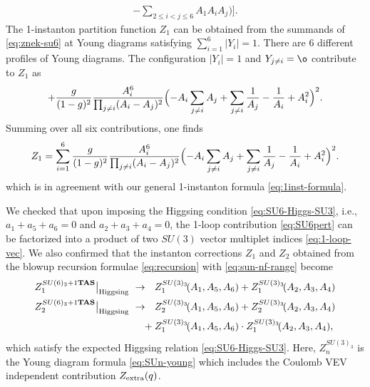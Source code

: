 \documentclass[letterpaper, 11pt]{article}
\begin{document}
{\begin{align}
    - \sum_{2\leq i<j \leq 6} A_1 A_i  A_j %
    \Bigr)
    \Biggr].
\end{align}
The 1-instanton partition function $Z_1$ can be obtained from the summands of \eqref{eq:znek-su6} at Young diagrams satisfying $\sum_{i=1}^6 |Y_i|=1$. There are 6 different profiles of Young diagrams. The configuration $|Y_i| = 1$ and %
$Y_{j\neq i} = \o$ contribute to $Z_{1}$ as
\begin{align}
  + \frac{g}{(1-g)^2} \frac{A_i^6}{\prod_{j \neq i} (A_i - A_j)^2} 
  \Bigl(-A_i \sum_{j\neq i} A_j +  \sum_{j\neq i}\frac{1}{A_j}  - \frac{1}{A_i} + A_i^2
 \Bigr)^2. 
\end{align}
Summing over all six contributions, one finds
\begin{align}
  Z_1 = \sum_{i=1}^6 \frac{g}{(1-g)^2} \frac{A_i^6}{\prod_{j \neq i} (A_i - A_j)^2} 
  \Bigl(-A_i \sum_{j\neq i} A_j +  \sum_{j\neq i}\frac{1}{A_j}  - \frac{1}{A_i} + A_i^2
 \Bigr)^2. 
\end{align}
which is in agreement with our general 1-instanton formula \eqref{eq:1inst-formula}.

We checked that upon imposing the Higgsing condition \eqref{eq:SU6-Higgs-SU3}, i.e., $a_1 + a_5 + a_6 = 0$ and $a_2 + a_3 + a_4 = 0$, the 1-loop contribution \eqref{eq:SU6pert} can be factorized into a product of two $SU(3)$ vector multiplet indices \eqref{eq:1-loop-vec}. We also confirmed that the instanton corrections $Z_1$ and $Z_2$ obtained from the blowup recursion formulae \eqref{eq:recursion} with \eqref{eq:sun-nf-range} become
\begin{align}
  \begin{split}
  Z_1^{SU(6)_{3}+1{\bf TAS}}\big|_{\rm Higgsing}~&\rightarrow ~~ Z_1^{SU(3)_{3}}
  \!(A_1, A_5,A_6)+Z_1^{SU(3)_{3}}\!(A_2, A_3,A_4)\\
  Z_2^{SU(6)_{3}+1{\bf TAS}}\big|_{\rm Higgsing}~&\rightarrow ~~ Z_2^{SU(3)_{3}}\!(A_1, A_5,A_6)+Z_2^{SU(3)_{3}}\!(A_2, A_3,A_4) \\
  &\quad+ Z_1^{SU(3)_{3}}\!(A_1, A_5,A_6)\cdot Z_1^{SU(3)_{3}}\!(A_2, A_3,A_4),
  \end{split}
\end{align}
which satisfy the expected Higgsing relation \eqref{eq:SU6-Higgs-SU3}. Here, $Z_n^{SU(3)_3}$ is the Young
diagram formula \eqref{eq:SUn-young} which includes the Coulomb VEV independent contribution $Z_{\rm extra}(q)$.



}
\end{document}
